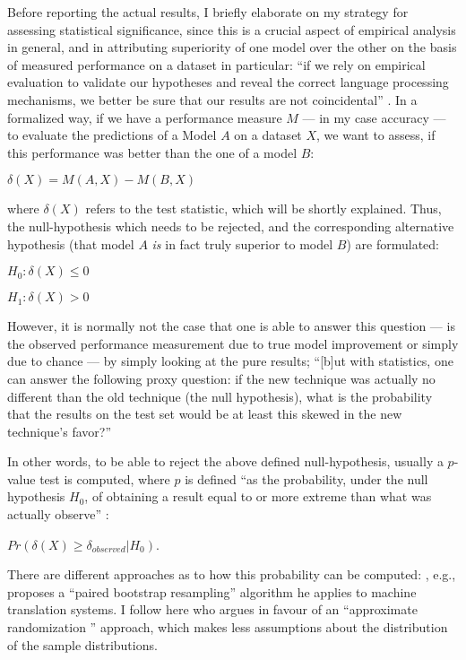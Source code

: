 Before reporting the actual results, I briefly elaborate on my strategy for
assessing statistical significance, since this is a crucial aspect of empirical
analysis in general, and in attributing superiority of one model over the other
on the basis of measured performance on a dataset in particular:
``if we rely on empirical evaluation to validate our hypotheses and reveal the
correct language processing mechanisms, we better be sure that our results are
not coincidental'' \citep{dror2018hitchhiker}. In a formalized way, if we have a
performance measure $M$ --- in my case accuracy --- to evaluate the predictions
of a Model $A$ on a dataset $X$, we want to assess, if this performance was better
than the one of a model $B$:

$\delta(X) = M(A, X) - M(B, X)$

where $\delta(X)$ refers to the test statistic, which will be shortly explained.
Thus, the null-hypothesis which needs to be rejected, and the corresponding
alternative hypothesis (that model $A$ \emph{is} in fact truly superior to model
$B$) are formulated:

$H_0:\delta(X) \leq 0$

$H_1:\delta(X) > 0$

However, it is normally not the case that one is able to answer this question --- is the observed
performance measurement due to true model improvement or simply due to chance --- by simply looking
at the pure results; ``[b]ut with statistics, one can answer the following proxy question: if the
new technique was actually no different than the old technique (the null hypothesis), what is the
probability that the results on the test set would be at least this skewed in the new technique’s
favor?'' \citep{yeh2000more}

In other words, to be able to reject the above defined null-hypothesis, usually a $p$-value test is
computed, where $p$ is defined ``as the probability, under the null hypothesis $H_0$, of obtaining
a result equal to or more extreme than what was actually observe'' \citep[p.~1384]{dror2018hitchhiker}:

$Pr(\delta(X) \geq \delta_{observed} | H_0)$.

There are different approaches as to how this probability can
be computed: \citep{koehn2004statistical}, e.g., proposes a
``paired bootstrap resampling'' algorithm he applies to machine
translation systems. I follow here \cite{morgan2005statistical} who
argues in favour of an ``approximate randomization '' approach,
which makes less assumptions about the distribution of the sample
distributions.

